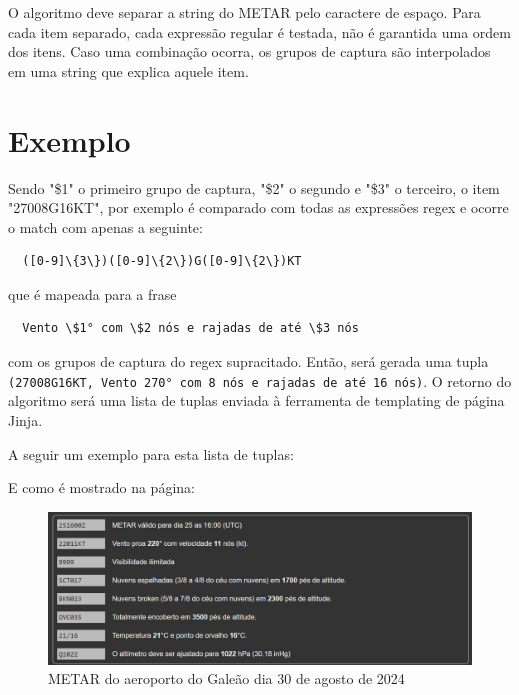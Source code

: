 O algoritmo deve separar a string do METAR pelo caractere de espaço. Para cada 
item separado, cada expressão regular é testada, não é garantida uma ordem dos itens.
 Caso uma combinação ocorra, os grupos de captura são interpolados em uma string 
 que explica aquele item. 

\section{Exemplo}

Sendo "\$1" o primeiro grupo de captura, "\$2" o segundo e "\$3" o terceiro, o item "27008G16KT", 
por exemplo é comparado com todas as expressões regex e ocorre o match com apenas a seguinte:

\begin{verbatim}
  ([0-9]\{3\})([0-9]\{2\})G([0-9]\{2\})KT
\end{verbatim}

que é mapeada para a frase

\begin{verbatim}
  Vento \$1° com \$2 nós e rajadas de até \$3 nós
\end{verbatim}

com os grupos de captura do regex supracitado. Então, será gerada uma tupla
\texttt{(27008G16KT, Vento 270° com 8 nós e rajadas de até 16 nós)}. O retorno do 
algoritmo será uma lista de tuplas enviada à ferramenta de templating
de página Jinja.

A seguir um exemplo para esta lista de tuplas:



E como é mostrado na página:

\begin{figure}[ht]
  \begin{center}
  \includegraphics[width=400pt]{img/metar-sbgl.png}
  \caption{METAR do aeroporto do Galeão dia 30 de agosto de 2024}
  \label{fig:metar-30-08}
  \end{center}
\end{figure}
